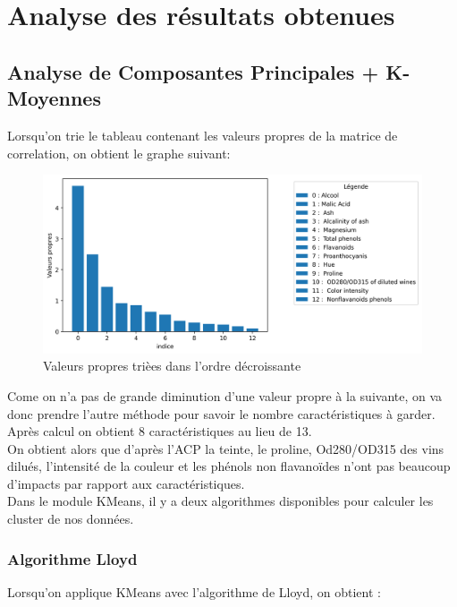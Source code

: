 \documentclass[a4paper,12pt]{article}
\begin{document}
\newpage

\section{Analyse des résultats obtenues}
\label{sec:analyse}

\subsection{Analyse de Composantes Principales + K-Moyennes}

Lorsqu'on trie le tableau contenant les valeurs propres de la matrice de correlation, on obtient le graphe suivant: \\

\begin{figure}[h!] %
   \centering
   \includegraphics[width=1\textwidth]{vp.png} %
   \caption{Valeurs propres trièes dans l'ordre décroissante}
   \label{fig:vp} %
\end{figure}  
             
Come on n'a pas de grande diminution d'une valeur propre à la suivante, on va donc prendre l'autre méthode pour savoir le nombre caractéristiques à garder. Après calcul on obtient 8 caractéristiques au lieu de 13.\\

On obtient alors que d'après l'ACP la teinte, le proline, Od280/OD315 des vins dilués, l'intensité de la couleur et les phénols non flavanoïdes n'ont pas beaucoup d'impacts par rapport aux caractéristiques.\\

Dans le module KMeans, il y a deux algorithmes disponibles pour calculer les cluster de nos données.

\subsubsection{Algorithme Lloyd}
Lorsqu'on applique KMeans avec l'algorithme de Lloyd, on obtient :
\end{document}
